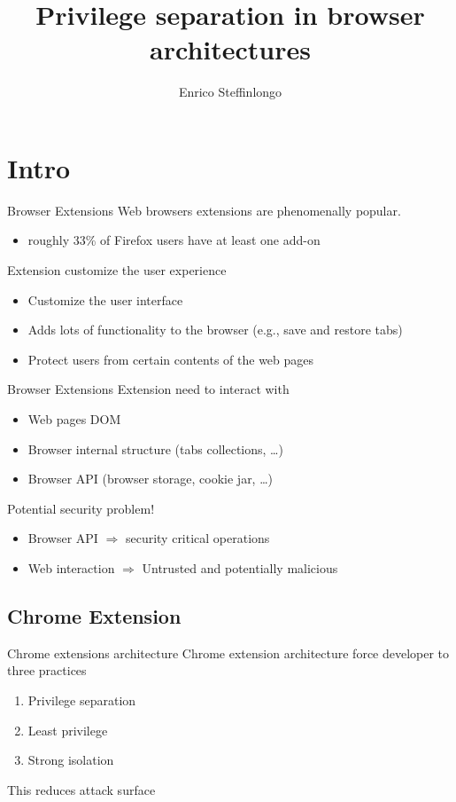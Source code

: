 \documentclass[11pt]{beamer}
\author{Enrico Steffinlongo}
\title{Privilege separation in browser architectures}
\institute[Universities Here and There] %
{
  Università Ca' Foscari - Computer science
}
\begin{document}
\begin{frame}
\titlepage
\end{frame}

\begin{frame}
\tableofcontents
\end{frame}

\section{Intro}
\begin{frame}{Browser Extensions}
Web browsers extensions are phenomenally popular.
\begin{itemize}
\item roughly 33\% of Firefox users have at least one add-on
\end{itemize}
Extension customize the user experience
\begin{itemize}
\item Customize the user interface
\item Adds lots of functionality to the browser (e.g., save and restore tabs)
\item Protect users from certain contents of the web pages 
\end{itemize}
\end{frame}

\begin{frame}{Browser Extensions}
Extension need to interact with
\begin{itemize}
\item Web pages DOM
\item Browser internal structure (tabs collections, \dots)
\item Browser API (browser storage, cookie jar, \dots)
\end{itemize}
Potential security problem!
\begin{itemize}
\item Browser API $\Rightarrow$ security critical operations\\
\item Web interaction $\Rightarrow$ Untrusted and potentially malicious\\
\end{itemize}
\end{frame}

\subsection{Chrome Extension}
\begin{frame}{Chrome extensions architecture}
Chrome extension architecture force developer to three practices
\begin{enumerate}
\item Privilege separation
\item Least privilege
\item Strong isolation
\end{enumerate}
This reduces attack surface
\end{frame}
\end{document}
